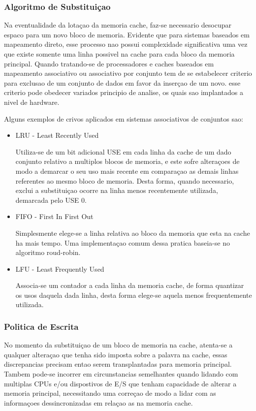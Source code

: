 \documentclass[12pt]{article}
\begin{document}
\subsubsection*{Algoritmo de Substituiçao}
Na eventualidade da lotaçao da memoria cache, faz-se necessario desocupar espaco para um novo bloco de memoria. Evidente que para sistemas baseados em mapeamento direto, esse processo nao possui complexidade significativa uma vez que existe somente uma linha possivel na cache para cada bloco da memoria principal. Quando tratando-se de processadores e caches baseados em mapeamento associativo ou associativo por conjunto tem de se estabelecer criterio para exclusao de um conjunto de dados em favor da inserçao de um novo. esse criterio pode obedecer variados principio de analise, os quais sao implantados a nivel de hardware. 

Alguns exemplos de crivos aplicados em sistemas associativos de conjuntos sao:
\begin{itemize}
\item LRU - Least Recently Used

Utiliza-se de um bit adicional USE em cada linha da cache de um dado conjunto relativo a multiplos blocos de memoria, e este sofre alteraçoes de modo a demarcar o seu uso mais recente em comparaçao as demais linhas referentes ao mesmo bloco de memoria. Desta forma, quando necessario, exclui a substituiçao ocorre na linha menos recentemente utilizada, demarcada pelo USE 0.

\item FIFO - First In First Out

Simplesmente elege-se a linha relativa ao bloco da memoria que esta na cache ha mais tempo. Uma implementaçao comum dessa pratica baseia-se no algoritmo roud-robin.

\item LFU - Least Frequently Used

Associa-se um contador a cada linha da memoria cache, de forma quantizar os usos daquela dada linha, desta forma elege-se aquela menos frequentemente utilizada.  
\end{itemize}

\subsubsection*{Politica de Escrita}
No momento da substituiçao de um bloco de memoria na cache, atenta-se a qualquer alteraçao que tenha sido imposta sobre a palavra na cache, essas discrepancias precisam entao serem transplantadas para memoria principal. Tambem pode-se incorrer em circunstancias semelhantes quando lidando com multiplas CPUs e/ou dispostivos de E/S que tenham capacidade de alterar a memoria principal, necessitando uma correçao de modo a lidar com as informaçoes dessincronizadas em relaçao as na memoria cache.
\end{document}
